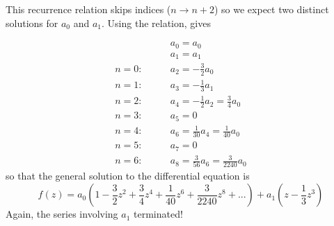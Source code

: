 \documentclass{article}
\begin{document}
This recurrence relation skips indices ($n\to n+2$) so we expect two
distinct solutions for $a_0$ and $a_1$. Using the relation, gives

\begin{align}
  &\qquad a_0 = a_0 \\
  &\qquad a_1 = a_1 \\
  n=0 :&\qquad a_2=-\frac{3}{2}a_0 \\
  n=1 :&\qquad a_3= -\frac{1}{3}a_1\\
  n=2 :&\qquad a_4=-\frac{1}{2}a_2=\frac{3}{4}a_0\\
  n=3 :&\qquad a_5=0 \\
  n=4 :&\qquad a_6=\frac{1}{30}a_4 = \frac{1}{40}a_0\\
  n=5 :&\qquad a_7=0 \\
  n=6 :&\qquad a_8=\frac{3}{56}a_6 = \frac{3}{2240}a_0
\end{align}
so that the general solution to the differential equation is
\begin{equation}
  f(z)= a_0\left(1-\frac{3}{2}z^2+\frac{3}{4}z^4+\frac{1}{40}z^6+\frac{3}{2240}z^8+...\right) + a_1\left(z-\frac{1}{3}z^3\right)
\end{equation}
Again, the series involving $a_1$ terminated! 
\end{document}
